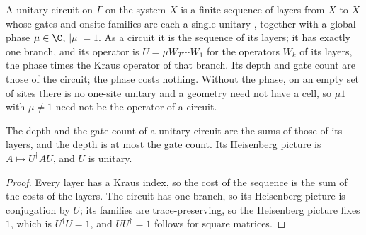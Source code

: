 \begin{definition}
    \label{def:unitary_circuit}
    \leanok
    A unitary circuit on $\Gamma$ on the system $X$ is a finite sequence of layers
    from $X$ to $X$ whose gates and onsite families are each a single unitary
    \cite{Malz2024Preparation, Piroli2021LOCC}, together with a global phase
    $\mu\in\C$, $|\mu|=1$. As a circuit it is the sequence of its layers; it has
    exactly one branch, and its operator is $U=\mu W_T\cdots W_1$ for the operators
    $W_k$ of its layers, the phase times the Kraus operator of that branch. Its depth
    and gate count are those of the circuit; the phase costs nothing. Without the
    phase, on an empty set of sites there is no one-site unitary and a geometry need
    not have a cell, so $\mu1$ with $\mu\ne1$ need not be the operator of a circuit.
\end{definition}

\begin{lemma}
    \label{lem:unitary_circuit_costs}
    \leanok
    The depth and the gate count of a unitary circuit are the sums of those of its
    layers, and the depth is at most the gate count. Its Heisenberg picture is
    $A\mapsto U^\dagger AU$, and $U$ is unitary.
\end{lemma}
\begin{proof}\leanok
    Every layer has a Kraus index, so the cost of the sequence is the sum of the
    costs of the layers. The circuit has one branch, so its Heisenberg picture is
    conjugation by $U$; its families are trace-preserving, so the Heisenberg picture
    fixes $1$, which is $U^\dagger U=1$, and $UU^\dagger=1$ follows for square
    matrices.
\end{proof}

